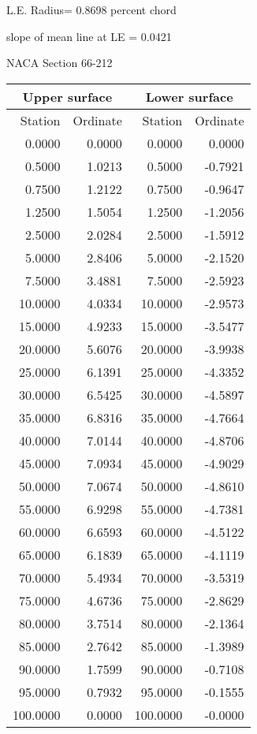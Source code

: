 \documentclass[11pt]{book}
\begin{document}
L.E. Radius=  0.8698 percent chord


 slope of mean line at LE =  0.0421
 \newpage
  \label{s66-212}
 \begin{Large}
 NACA Section 66-212
 \end{Large}
  
 \vspace{8mm}
 \begin{tabular}{|r|r|r|r|} \hline 
 \multicolumn{2}{|c|}{Upper surface} & \multicolumn{2}{|c|}{Lower surface} \\
 \hline
 Station & Ordinate & Station & Ordinate \\
 \hline
0.0000 & 0.0000 & 0.0000 & 0.0000 \\
0.5000 & 1.0213 & 0.5000 & -0.7921 \\
0.7500 & 1.2122 & 0.7500 & -0.9647 \\
1.2500 & 1.5054 & 1.2500 & -1.2056 \\
2.5000 & 2.0284 & 2.5000 & -1.5912 \\
5.0000 & 2.8406 & 5.0000 & -2.1520 \\
7.5000 & 3.4881 & 7.5000 & -2.5923 \\
10.0000 & 4.0334 & 10.0000 & -2.9573 \\
15.0000 & 4.9233 & 15.0000 & -3.5477 \\
20.0000 & 5.6076 & 20.0000 & -3.9938 \\
25.0000 & 6.1391 & 25.0000 & -4.3352 \\
30.0000 & 6.5425 & 30.0000 & -4.5897 \\
35.0000 & 6.8316 & 35.0000 & -4.7664 \\
40.0000 & 7.0144 & 40.0000 & -4.8706 \\
45.0000 & 7.0934 & 45.0000 & -4.9029 \\
50.0000 & 7.0674 & 50.0000 & -4.8610 \\
55.0000 & 6.9298 & 55.0000 & -4.7381 \\
60.0000 & 6.6593 & 60.0000 & -4.5122 \\
65.0000 & 6.1839 & 65.0000 & -4.1119 \\
70.0000 & 5.4934 & 70.0000 & -3.5319 \\
75.0000 & 4.6736 & 75.0000 & -2.8629 \\
80.0000 & 3.7514 & 80.0000 & -2.1364 \\
85.0000 & 2.7642 & 85.0000 & -1.3989 \\
90.0000 & 1.7599 & 90.0000 & -0.7108 \\
95.0000 & 0.7932 & 95.0000 & -0.1555 \\
100.0000 & 0.0000 & 100.0000 & -0.0000 \\
 \hline 
 \end{tabular}
\end{document}
